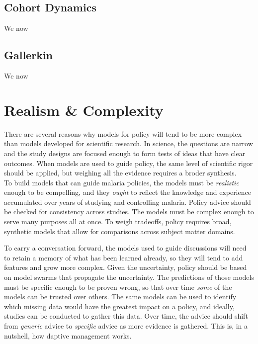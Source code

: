 \documentclass[
]{book}
\begin{document}
\section{Cohort Dynamics}\label{cohort-dynamics}

We now

\section{Gallerkin}\label{gallerkin}

We now

\chapter{Realism \& Complexity}\label{realism-complexity}

There are several reasons why models for policy will tend to be more complex than models developed for scientific research.
In science, the questions are narrow and the study designs are focused enough to form tests of ideas that have clear outcomes.
When models are used to guide policy, the same level of scientific rigor should be applied, but weighing all the evidence requires a broder synthesis.\\
To build models that can guide malaria policies, the models must be \emph{realistic} enough to be compelling, and they \emph{ought} to reflect the knowledge and experience accumulated over years of studying and controlling malaria.
Policy advice should be checked for consistency across studies.
The models must be complex enough to serve many purposes all at once.
To weigh tradeoffs, policy requires broad, synthetic models that allow for comparisons across subject matter domains.

To carry a conversation forward, the models used to guide discussions will need to retain a memory of what has been learned already, so they will tend to add features and grow more complex.
Given the uncertainty, policy should be based on model swarms that propagate the uncertainty.
The predictions of those models must be specific enough to be proven wrong, so that over time \emph{some} of the models can be trusted over others.
The same models can be used to identify which missing data would have the greatest impact on a policy, and ideally, studies can be conducted to gather this data.
Over time, the advice should shift from \emph{generic} advice to \emph{specific} advice as more evidence is gathered.
This is, in a nutshell, how daptive management works.
\end{document}
